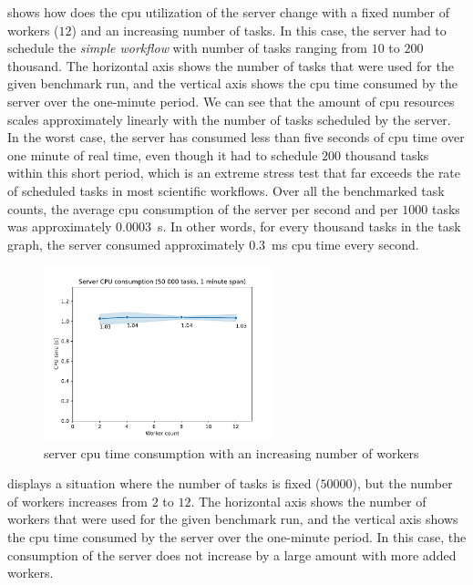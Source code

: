  shows how does the \gls{cpu} utilization of the
server change with a fixed number of workers ($12$) and an increasing number of
tasks. In this case, the server had to schedule the \emph{simple workflow} with number of tasks
ranging from $10$ to $200$ thousand. The horizontal axis shows
the number of tasks that were used for the given benchmark run, and the vertical axis shows the
\gls{cpu} time consumed by the server over the one-minute period. We can see that the
amount of \gls{cpu} resources scales approximately linearly with the number of tasks
scheduled by the server. In the worst case, the server has consumed less than five seconds of
\gls{cpu} time over one minute of real time, even though it had to schedule
$200$ thousand tasks within this short period, which is an extreme stress test
that far exceeds the rate of scheduled tasks in most scientific workflows. Over all the benchmarked
task counts, the average \gls{cpu} consumption of the server per second and per
$1000$ tasks was approximately \SI{0.0003}{\second}. In other words, for every
thousand tasks in the task graph, the server consumed approximately \SI{0.3}{\milli\second}
\gls{cpu} time every second.

\begin{figure}[h]
	\centering
	\includegraphics[width=0.6\textwidth]{imgs/hq/charts/server-utilization-workers}
	\caption{\hyperqueue{} server \acrshort{cpu} time consumption with an increasing number of workers}
	\label{fig:hq-server-cpu-consumption-workers}
\end{figure}

 displays a situation where the number of tasks
is fixed ($50000$), but the number of workers increases from
$2$ to $12$. The horizontal axis shows the number of workers
that were used for the given benchmark run, and the vertical axis shows the \gls{cpu}
time consumed by the server over the one-minute period. In this case, the consumption of the server
does not increase by a large amount with more added workers.


